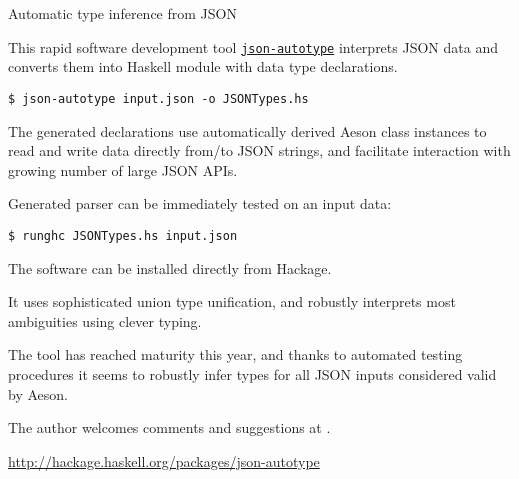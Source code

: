 \begin{hcarentry}[new]{Automatic type inference from JSON}
\label{jsonautotype}
\makeheader

This rapid software development tool \href{https://github.com/mgajda/json-autotype}{\texttt{json-autotype}} interprets JSON
data and converts them into Haskell module with data type declarations.

\begin{verbatim}
$ json-autotype input.json -o JSONTypes.hs
\end{verbatim}

The generated declarations use automatically derived Aeson class instances
to read and write data directly from/to JSON strings,
and facilitate interaction with growing number of large JSON APIs.

Generated parser can be immediately tested on an input data:

\begin{verbatim}
$ runghc JSONTypes.hs input.json
\end{verbatim}

The software can be installed directly from Hackage.

It uses sophisticated union type unification, and robustly
interprets most ambiguities using clever typing.

The tool has reached maturity this year, and thanks to automated testing procedures it seems to robustly infer types
for all JSON inputs considered valid by Aeson.

The author welcomes comments and suggestions at .

\FurtherReading
\url{http://hackage.haskell.org/packages/json-autotype}
\end{hcarentry}
